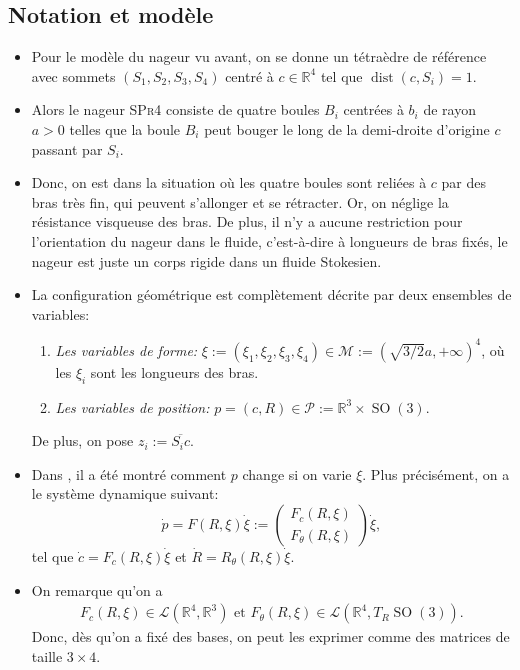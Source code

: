 \documentclass[12pt,a4paper]{article}
\theoremstyle{plain}
\theoremstyle{plain}
\theoremstyle{plain}
\theoremstyle{definition}
\theoremstyle{definition}
\theoremstyle{definition}
\theoremstyle{plain}
\newcommand{\M}{\mathcal{M}}
\newcommand{\R}{\mathbb{R}}
\DeclareMathOperator{\dist}{dist}
\DeclareMathOperator{\SO}{SO}
\begin{document}
\subsection{Notation et modèle}
\begin{itemize}

\item Pour le modèle du nageur vu avant, on se donne un tétraèdre de référence avec sommets $(S_1, S_2, S_3, S_4)$ centré à $c \in \R^4$ tel que $\dist(c, S_i) = 1$.

\item Alors le nageur \textsc{SPr4} consiste de quatre boules $B_i$ centrées à $b_i$ de rayon $a > 0$ telles que la boule $B_i$ peut bouger le long de la demi-droite d'origine $c$ passant par $S_i$.

\item Donc, on est dans la situation où les quatre boules sont reliées à $c$ par des bras très fin, qui peuvent s'allonger et se rétracter. Or, on néglige la résistance visqueuse des bras. De plus, il n'y a aucune restriction pour l'orientation du nageur dans le fluide, c'est-à-dire à longueurs de bras fixés, le nageur est juste un corps rigide dans un fluide Stokesien.

\item La configuration géométrique est complètement décrite par deux ensembles de variables:
\begin{enumerate}
\item \emph{Les variables de forme:} $\xi := (\xi_1, \xi_2, \xi_3, \xi_4) \in \M := (\sqrt{3/2}a, + \infty)^4$, où les $\xi_i$ sont les longueurs des bras.

\item \emph{Les variables de position:} $p = (c, R) \in \mathcal{P} := \R^3 \times \SO(3)$.
\end{enumerate}
De plus, on pose $z_i := \overline{S_i c}$. 

\item Dans \cite{Alouges2013}, il a été montré comment $p$ change si on varie $\xi$. Plus précisément, on a le système dynamique suivant:
\begin{equation}
\label{eq: control system}
	\dot{p} = F(R, \xi) \dot{\xi} := \left ( \begin{array}{c}
	F_c(R, \xi) \\
	F_\theta(R, \xi)
	\end{array}  \right ) \dot{\xi},
\end{equation}
tel que $\dot{c} = F_{c}(R, \xi) \dot{\xi}$ et $\dot{R} = R_{\theta}(R, \xi) \dot{\xi}$.

\item On remarque qu'on a
\begin{equation}
\begin{aligned}
	F_c(R, \xi) \in \mathcal{L}(\R^4, \R^3) \text{ et } F_{\theta}(R, \xi) \in \mathcal{L}(\R^4,T_R \SO(3)).
\end{aligned}
\end{equation}
Donc, dès qu'on a fixé des bases, on peut les exprimer comme des matrices de taille $3 \times 4$.

\end{itemize}
\end{document}
